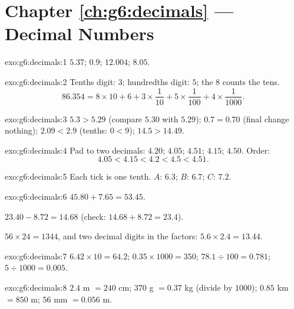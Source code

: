 \section*{Chapter \ref{ch:g6:decimals} --- Decimal Numbers}

\begin{solution}{exo:g6:decimals:1}
$5.37$; \quad $0.9$; \quad $12.004$; \quad $8.05$.
\end{solution}

\begin{solution}{exo:g6:decimals:2}
Tenths digit: $3$; hundredths digit: $5$; the $8$ counts the tens.
\[
86.354 = 8 \times 10 + 6 + 3 \times \frac{1}{10} + 5 \times
\frac{1}{100} + 4 \times \frac{1}{1000}.
\]
\end{solution}

\begin{solution}{exo:g6:decimals:3}
$5.3 > 5.29$ (compare $5.30$ with $5.29$); \quad
$0.7 = 0.70$ (final  change nothing); \quad
$2.09 < 2.9$ (tenths: $0 < 9$); \quad
$14.5 > 14.49$.
\end{solution}

\begin{solution}{exo:g6:decimals:4}
Pad to two decimals: $4.20$; $4.05$; $4.51$; $4.15$; $4.50$. Order:
\[
4.05 < 4.15 < 4.2 < 4.5 < 4.51 .
\]
\end{solution}

\begin{solution}{exo:g6:decimals:5}
Each tick is one tenth. $A$: $6.3$; \quad $B$: $6.7$; \quad
$C$: $7.2$.
\end{solution}

\begin{solution}{exo:g6:decimals:6}
$45.80 + 7.65 = 53.45$.

$23.40 - 8.72 = 14.68$ (check: $14.68 + 8.72 = 23.4$).

$56 \times 24 = 1344$, and two decimal digits in the factors:
$5.6 \times 2.4 = 13.44$.
\end{solution}

\begin{solution}{exo:g6:decimals:7}
$6.42 \times 10 = 64.2$; \quad
$0.35 \times 1000 = 350$; \quad
$78.1 \div 100 = 0.781$; \quad
$5 \div 1000 = 0.005$.
\end{solution}

\begin{solution}{exo:g6:decimals:8}
$2.4$ m $= 240$ cm; \quad $370$ g $= 0.37$ kg (divide by $1000$);
\quad $0.85$ km $= 850$ m; \quad $56$ mm $= 0.056$ m.
\end{solution}

